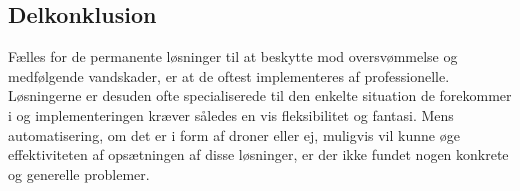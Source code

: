 \subsection{Delkonklusion}
Fælles for de permanente løsninger til at beskytte mod oversvømmelse og medfølgende vandskader, er at de oftest implementeres af professionelle. Løsningerne er desuden ofte specialiserede til den enkelte situation de forekommer i og implementeringen kræver således en vis fleksibilitet og fantasi. Mens automatisering, om det er i form af droner eller ej, muligvis vil kunne øge effektiviteten af opsætningen af disse løsninger, er der ikke fundet nogen konkrete og generelle problemer.








